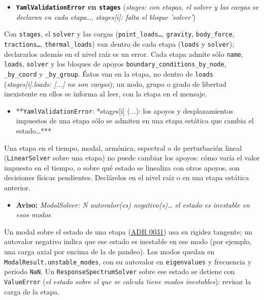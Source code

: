 \documentclass[11pt,oneside]{report}
\begin{document}
\begin{itemize}
  \item \textbf{\texttt{YamlValidationError} en \texttt{stages}} (\textit{stages: con etapas, el solver y las cargas se declaran en cada etapa\ldots{}}, \textit{stages[i]: falta el bloque 'solver'})
\end{itemize}
  Con \texttt{stages}, el \texttt{solver} y las cargas (\texttt{point\_loads\ldots{}}, \texttt{gravity}, \texttt{body\_force}, \texttt{tractions\ldots{}}, \texttt{thermal\_loads}) van dentro de cada etapa (\texttt{loads} y \texttt{solver}); declararlos además en el nivel raíz es un error. Cada etapa admite sólo \texttt{name}, \texttt{loads}, \texttt{solver} y los bloques de apoyos \texttt{boundary\_\allowbreak{}conditions\_\allowbreak{}by\_\allowbreak{}node}, \texttt{\_by\_coord} y \texttt{\_by\_group}. Éstos van en la etapa, no dentro de \texttt{loads} (\textit{stages[i].loads: [...] no son cargas}); un nodo, grupo o grado de libertad inexistente en ellos se informa al leer, con la etapa en el mensaje.

\begin{itemize}
  \item **\texttt{YamlValidationError}: *stages[i] (...): los apoyos y desplazamientos impuestos de una etapa sólo se admiten en una etapa estática que cambia el estado\ldots{}***
\end{itemize}
  Una etapa en el tiempo, modal, armónica, espectral o de perturbación lineal (\texttt{LinearSolver} sobre una etapa) no puede cambiar los apoyos: cómo varía el valor impuesto en el tiempo, o sobre qué estado se linealiza con otros apoyos, son decisiones físicas pendientes. Declárelos en el nivel raíz o en una etapa estática anterior.

\begin{itemize}
  \item \textbf{Aviso:} \textit{ModalSolver: N autovalor(es) negativo(s)\ldots{} el estado es inestable en esos modos}
\end{itemize}
  Un modal sobre el estado de una etapa (\href{https://github.com/jretamav/solidum-fem/blob/main/docs/adr/0031-analisis-lineales-sobre-el-estado-de-una-etapa.md}{ADR 0031}) usa su rigidez tangente; un autovalor negativo indica que ese estado es inestable en ese modo (por ejemplo, una carga axial por encima de la de pandeo). Los modos quedan en \texttt{ModalResult.\allowbreak{}unstable\_\allowbreak{}modes}, con su autovalor en \texttt{eigenvalues} y frecuencia y periodo \texttt{NaN}. Un \texttt{ResponseSpectrumSolver} sobre ese estado se detiene con \texttt{ValueError} (\textit{el estado sobre el que se calcula tiene modos inestables}): revisar la carga de la etapa.
\end{document}
